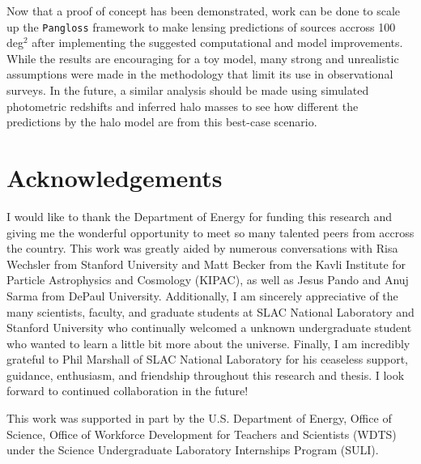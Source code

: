 \documentclass[%
 reprint,
 amsmath,amssymb,
 aps,nofootinbib
]{revtex4-1}
\begin{document}
Now that a proof of concept has been demonstrated, work can be done to scale up the \texttt{Pangloss} framework to make lensing predictions of sources accross 100 deg$^2$ after implementing the suggested computational and model improvements. While the results are encouraging for a toy model, many strong and unrealistic assumptions were made in the methodology that limit its use in observational surveys. In the future, a similar analysis should be made using simulated photometric redshifts and inferred halo masses to see how different the predictions by the halo model are from this best-case scenario.

\vspace{0.04 in}

\section{Acknowledgements}

I would like to thank the Department of Energy for funding this research and giving me the wonderful opportunity to meet so many talented peers from accross the country. This work was greatly aided by numerous conversations with Risa Wechsler from Stanford University and Matt Becker from the Kavli Institute for Particle Astrophysics and Cosmology (KIPAC), as well as Jesus Pando and Anuj Sarma from DePaul University. Additionally, I am sincerely appreciative of the many scientists, faculty, and graduate students at SLAC National Laboratory and Stanford University who continually welcomed a unknown undergraduate student who wanted to learn a little bit more about the universe. Finally, I am incredibly grateful to Phil Marshall of SLAC National Laboratory for his ceaseless support, guidance, enthusiasm, and friendship throughout this research and thesis. I look forward to continued collaboration in the future!

This work was supported in part by the U.S. Department of Energy, Office of Science, Office of Workforce Development for Teachers and Scientists (WDTS) under the Science Undergraduate Laboratory Internships Program (SULI).


\onecolumngrid

\vspace{0.25 in}
\end{document}
